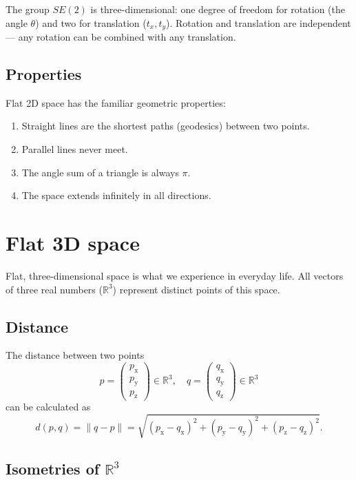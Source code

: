 \documentclass[twocolumn,10pt]{article}
\begin{document}
The group $SE(2)$ is three-dimensional: one degree of freedom for rotation (the angle $\theta$) and two for translation ($t_x, t_y$). Rotation and translation are independent --- any rotation can be combined with any translation.

\subsection{Properties}

Flat 2D space has the familiar geometric properties:
\begin{enumerate}
    \item Straight lines are the shortest paths (geodesics) between two points.
    \item Parallel lines never meet.
    \item The angle sum of a triangle is always $\pi$.
    \item The space extends infinitely in all directions.
\end{enumerate}


\section{Flat 3D space}

Flat, three-dimensional space is what we experience in everyday life. All vectors of three real numbers ($\mathbb{R}^3$) represent distinct points of this space.

\subsection{Distance}

The distance between two points
\[
    p = \begin{pmatrix}p_\mathrm{x}\\p_\mathrm{y}\\p_\mathrm{z}\end{pmatrix} \in \mathbb{R}^3, \quad q = \begin{pmatrix}q_\mathrm{x}\\q_\mathrm{y}\\q_\mathrm{z}\end{pmatrix} \in \mathbb{R}^3
\]
can be calculated as
\[
    d(p, q) = \| q - p \| = \sqrt{(p_\mathrm{x} - q_\mathrm{x})^2 + (p_\mathrm{y} - q_\mathrm{y})^2 + (p_\mathrm{z} - q_\mathrm{z})^2}.
\]

\subsection{Isometries of $\mathbb{R}^3$}
\end{document}
